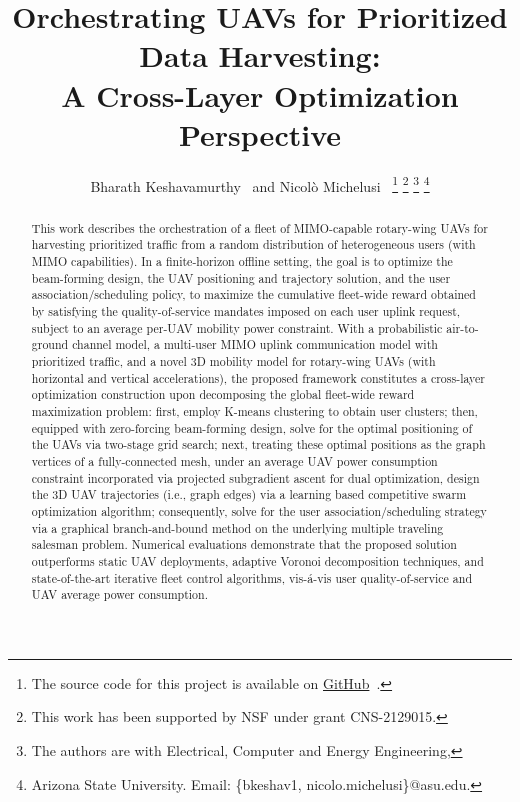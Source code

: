 \documentclass[10pt, twocolumn]{IEEEtran}
\title{Orchestrating UAVs for Prioritized Data Harvesting:\\ A Cross-Layer Optimization Perspective}
\author{Bharath Keshavamurthy~\IEEEmembership{Student Member, IEEE} and Nicol\`{o} Michelusi~\IEEEmembership{Senior Member, IEEE}
\thanks{The source code for this project is available on \href{https://github.com/bharathkeshavamurthy/ACCUSTOM.git}{GitHub}~\cite{Source_Code}.}
\thanks{This work has been supported by NSF under grant CNS-2129015.}
\thanks{The authors are with Electrical, Computer and Energy Engineering,}
\thanks{Arizona State University. Email: \{bkeshav1, nicolo.michelusi\}@asu.edu.}
\vspace{-12mm}}
\begin{document}

\maketitle
\thispagestyle{empty}
\pagestyle{empty}
\vspace{-12mm}

\begin{abstract}
This work describes the orchestration of a fleet of MIMO-capable rotary-wing UAVs for harvesting prioritized traffic from a random distribution of heterogeneous users (with MIMO capabilities). In a finite-horizon offline setting, the goal is to optimize the beam-forming design, the UAV positioning and trajectory solution, and the user association/scheduling policy, to maximize the cumulative fleet-wide reward obtained by satisfying the quality-of-service mandates imposed on each user uplink request, subject to an average per-UAV mobility power constraint. With a probabilistic air-to-ground channel model, a multi-user MIMO uplink communication model with prioritized traffic, and a novel $3$D mobility model for rotary-wing UAVs (with horizontal and vertical accelerations), the proposed framework constitutes a cross-layer optimization construction upon decomposing the global fleet-wide reward maximization problem: first, employ K-means clustering to obtain user clusters; then, equipped with zero-forcing beam-forming design, solve for the optimal positioning of the UAVs via two-stage grid search; next, treating these optimal positions as the graph vertices of a fully-connected mesh, under an average UAV power consumption constraint incorporated via projected subgradient ascent for dual optimization, design the $3$D UAV trajectories (i.e., graph edges) via a learning based competitive swarm optimization algorithm; consequently, solve for the user association/scheduling strategy via a graphical branch-and-bound method on the underlying multiple traveling salesman problem. Numerical evaluations demonstrate that the proposed solution outperforms static UAV deployments, adaptive Voronoi decomposition techniques, and state-of-the-art iterative fleet control algorithms, vis-\'{a}-vis user quality-of-service and UAV average power consumption.
\end{abstract}
\vspace{-4mm}

\end{document}
